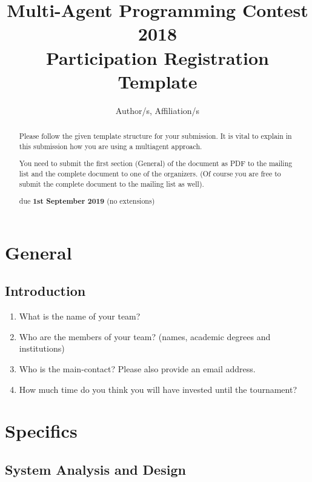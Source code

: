 \documentclass{article}
\begin{document}
\title{Multi-Agent Programming Contest 2018\\Participation Registration Template}
\author{Author/s, Affiliation/s}
\maketitle

\begin{abstract}
  Please follow the given template structure for your submission. It is vital to explain in this submission how you are using a multiagent approach.

  You need to submit the first section (General) of the document as PDF to the mailing list and the complete document to one of the organizers. (Of course you are free to submit the complete document to the mailing list as well).

  \begin{center}
    due \textbf{1st September 2019} (no extensions)
  \end{center}
\end{abstract}


\section*{General}

\subsection*{Introduction}

\begin{enumerate}
  \item What is the name of your team?
  \item Who are the members of your team? (names, academic degrees and institutions)
  \item Who is the main-contact? Please also provide an email address.
  \item How much time do you think you will have invested until the tournament?
\end{enumerate}

\section*{Specifics}

\subsection*{System Analysis and Design}
\end{document}
